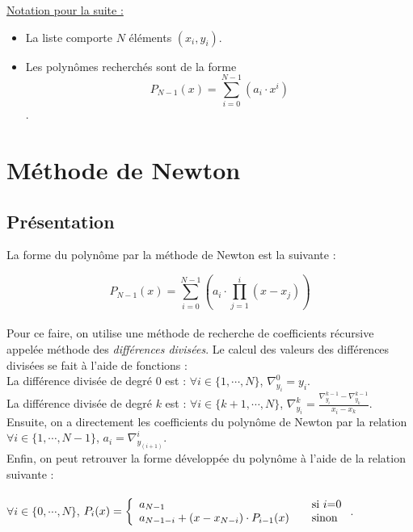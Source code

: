 \documentclass{report}
\begin{document}
    \underline{Notation pour la suite :}
    \vspace{0.1 cm}
    \begin{itemize}
      \item{La liste comporte $N$ éléments $(x_{i},y_{i})$.}
      \item{Les polynômes recherchés sont de la forme \[P_{N-1}(x)= \sum_{i=0}^{N-1} (a_{i} \cdot x^{i})\].}
    \end{itemize}
    \section{Méthode de Newton}
      \subsection{Présentation}
	\noindent La forme du polynôme par la méthode de Newton est la suivante : 
    	
    	\[P_{N-1}(x)= \sum_{i=0}^{N-1} \left( a_{i} \cdot \prod_{j=1}^{i} (x-x_{j}) \right)\] \\
	Pour ce faire, on utilise une méthode de recherche de coefficients récursive appelée méthode des \textit{différences divisées}. Le calcul des valeurs des différences divisées se fait à l'aide de fonctions : \\
    	
    	\noindent La différence divisée de degré $0$ est : $\forall i \in \{1, \cdots, N\}$, \indent $\nabla^{0}_{y_{i}} = y_{i}$.\\
    	 
	\noindent La différence divisée de degré $k$ est : $\forall i \in \{k+1,\cdots,N\}$, \indent $\nabla^{k}_{y_{i}} = \frac{\nabla^{k-1}_{y_{i}}-\nabla^{k-1}_{y_{k}}}{x_{i}-x_{k}}$.\\
    	 
    	\noindent Ensuite, on a directement les coefficients du polynôme de Newton par la relation\\
    	$ \forall i \in \{1, \cdots, N-1\}$, \indent $a_{i} = \nabla^{i}_{y_{(i+1)}}$.\\
    	 
    	\noindent Enfin, on peut retrouver la forme développée du polynôme à l'aide de la relation suivante :\\ \\
    	$\forall i \in \{0,\cdots,N\}$, \indent
    	$P_{i}(x) = \left\{
	\begin{array}{l l}
	  a_{N-1} & \quad \text{si $i$=0}\\
	  a_{N-1-i} + (x-x_{N-i}) \cdot P_{i-1}(x) & \quad \text{sinon}
	\end{array} \right. $. 
\end{document}
